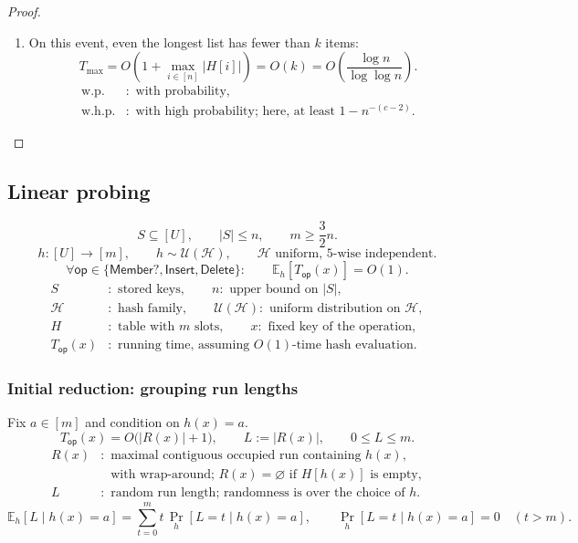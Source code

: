 \documentclass[12pt,a4paper]{article}
\begin{document}
\begin{proof}
\begin{enumerate}
\item On this event, even the longest list has fewer than $k$ items:
\[
T_{\max}
=O\!\left(1+\max_{i\in[n]}|H[i]|\right)
=O(k)
=O\!\left(\frac{\log n}{\log\log n}\right).
\]
\[
\begin{aligned}
\text{w.p.}&:\text{ with probability},\\
\text{w.h.p.}&:\text{ with high probability; here, at least }1-n^{-(c-2)}.
\end{aligned}
\]
\end{enumerate}
\end{proof}

\clearpage
\setcounter{subsection}{3}
\subsection{Linear probing}

\setcounter{theorem}{5}
\begin{theorem}
\label{thm:linear-probing-expected-time}
\[
S\subseteq[U],\qquad |S|\leq n,\qquad m\geq\frac32n.
\]
\[
h:[U]\to[m],\qquad h\sim\mathcal U(\mathcal H),\qquad
\mathcal H\text{ uniform, 5-wise independent}.
\]
\[
\forall\mathsf{op}\in\{\mathsf{Member?},\mathsf{Insert},\mathsf{Delete}\}:\qquad
\mathbb E_h[T_{\mathsf{op}}(x)]=O(1).
\]
\[
\begin{aligned}
S&:\text{ stored keys},\qquad n:\text{ upper bound on }|S|,\\
\mathcal H&:\text{ hash family},\qquad
\mathcal U(\mathcal H):\text{ uniform distribution on }\mathcal H,\\
H&:\text{ table with }m\text{ slots},\qquad x:\text{ fixed key of the operation},\\
T_{\mathsf{op}}(x)&:\text{ running time, assuming }O(1)\text{-time hash evaluation}.
\end{aligned}
\]
\end{theorem}

\subsubsection*{Initial reduction: grouping run lengths}
Fix $a\in[m]$ and condition on $h(x)=a$.
\[
T_{\mathsf{op}}(x)=O\bigl(|R(x)|+1\bigr),\qquad
L:=|R(x)|,\qquad 0\leq L\leq m.
\]
\[
\begin{aligned}
R(x)&:\text{ maximal contiguous occupied run containing }h(x),\\
&\phantom{:}\text{ with wrap-around; }R(x)=\varnothing\text{ if }H[h(x)]\text{ is empty},\\
L&:\text{ random run length; randomness is over the choice of }h.
\end{aligned}
\]
\[
\mathbb E_h[L\mid h(x)=a]=\sum_{t=0}^{m}t\,\Pr_h[L=t\mid h(x)=a],\qquad
\Pr_h[L=t\mid h(x)=a]=0\quad(t>m).
\]
\end{document}
